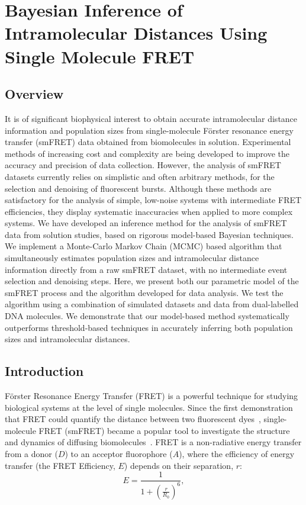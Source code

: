 \chapter{Bayesian Inference of Intramolecular Distances Using Single Molecule FRET}
\section{Overview}
It is of significant biophysical interest to obtain accurate intramolecular distance information and population sizes from single-molecule F\"{o}rster resonance energy transfer (smFRET) data obtained from biomolecules in solution.  Experimental methods of increasing cost and complexity are being developed to improve the accuracy and precision of data collection.  However, the analysis of smFRET datasets currently relies on simplistic and often arbitrary methods, for the selection and denoising of fluorescent bursts.  Although these methods are satisfactory for the analysis of simple, low-noise systems with intermediate FRET efficiencies, they display systematic inaccuracies when applied to more complex systems.  We have developed an inference method for the analysis of smFRET data from solution studies, based on rigorous model-based Bayesian techniques.  We implement a Monte-Carlo Markov Chain (MCMC) based algorithm that simultaneously estimates population sizes and intramolecular distance information directly from a raw smFRET dataset, with no intermediate event selection and denoising steps.  Here, we present both our parametric model of the smFRET process and the algorithm developed for data analysis.  We test the algorithm using a combination of simulated datasets and data from dual-labelled DNA molecules. We demonstrate that our model-based method systematically outperforms threshold-based techniques in accurately inferring both population sizes and intramolecular distances.

\section{Introduction}
F\"{o}rster Resonance Energy Transfer (FRET) is a powerful technique for studying biological systems at the level of single molecules.  Since the first demonstration that FRET could quantify the distance between two fluorescent dyes~\cite{ha96}, single-molecule FRET (smFRET) became a popular tool to investigate the structure and dynamics of diffusing biomolecules~\cite{haran03, schuler02, weiss00}.  FRET is a non-radiative energy transfer from a donor ($D$) to an acceptor fluorophore ($A$), where the efficiency of energy transfer (the FRET Efficiency, $E$) depends on their separation, $r$: 
\begin{equation}
E = \frac{1}{1 + (\frac{r}{R_0})^6} , 
\label{eq:efficiency}
\end{equation}   

